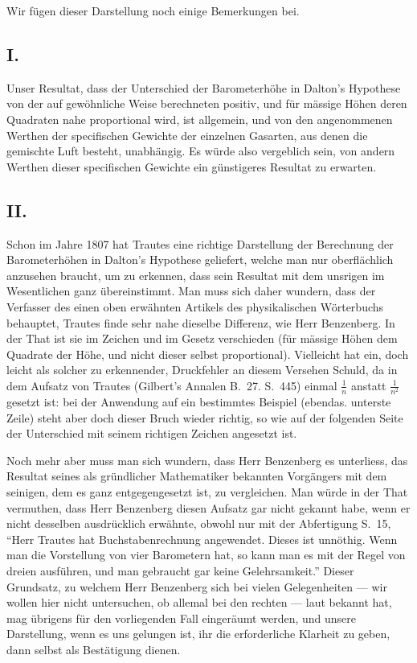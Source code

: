 \documentclass[fontsize=10pt,paper=a5,pagesize=auto]{scrbook}
\newcommand{\origpage}[1]{\marginpar{\footnotesize\textit{S. #1}}}
\begin{document}
Wir fügen dieser Darstellung noch einige Bemerkungen bei.

\subsection*{I.}
Unser Resultat, dass der Unterschied der Barometerhöhe in Dalton's Hypothese von der auf gewöhnliche Weise berechneten positiv, und für mässige Höhen deren Quadraten nahe proportional wird, ist allgemein, und von den angenommenen Werthen der specifischen Gewichte der einzelnen Gasarten, aus denen die gemischte Luft besteht, unabhängig. Es würde also vergeblich sein, von andern Werthen dieser specifischen Gewichte ein günstigeres Resultat zu erwarten.

\subsection*{II.}
\origpage{590}
Schon im Jahre 1807 hat Trautes eine richtige Darstellung der Berechnung der Barometerhöhen in Dalton's Hypothese geliefert, welche man nur oberflächlich anzusehen braucht, um zu erkennen, dass sein Resultat mit dem unsrigen im Wesentlichen ganz übereinstimmt. Man muss sich daher wundern, dass der Verfasser des einen oben erwähnten Artikels des physikalischen Wörterbuchs behauptet, Trautes finde sehr nahe dieselbe Differenz, wie Herr Benzenberg. In der That ist sie im Zeichen und im Gesetz verschieden (für mässige Höhen dem Quadrate der Höhe, und nicht dieser selbst proportional). Vielleicht hat ein, doch leicht als solcher zu erkennender, Druckfehler an diesem Versehen Schuld, da in dem Aufsatz von Trautes (Gilbert's Annalen B.~27. S.~445) einmal $\frac{1}{n}$ anstatt $\frac{1}{n^2}$ gesetzt ist: bei der Anwendung auf ein bestimmtes Beispiel (ebendas. unterste Zeile) steht aber doch dieser Bruch wieder richtig, so wie auf der folgenden Seite der Unterschied mit seinem richtigen Zeichen angesetzt ist.

Noch mehr aber muss man sich wundern, dass Herr Benzenberg es unterliess, das Resultat seines als gründlicher Mathematiker bekannten Vorgängers mit dem seinigen, dem es ganz entgegengesetzt ist, zu vergleichen. Man würde in der That vermuthen, dass Herr Benzenberg diesen Aufsatz gar nicht gekannt habe, wenn er nicht desselben ausdrücklich erwähnte, obwohl nur mit der Abfertigung S.~15, \enquote{Herr Trautes hat Buchstabenrechnung angewendet. Dieses ist unnöthig. Wenn man die Vorstellung von vier Barometern hat, so kann man es mit der Regel von dreien ausführen, und man gebraucht gar keine Gelehrsamkeit.} Dieser Grundsatz, zu welchem Herr Benzenberg sich bei vielen Gelegenheiten --- wir wollen hier nicht untersuchen, ob allemal bei den rechten --- laut bekannt hat, mag übrigens für den vorliegenden Fall eingeräumt werden, und unsere Darstellung, wenn es uns gelungen ist, ihr die erforderliche Klarheit zu geben, dann selbst als Bestätigung dienen.
\end{document}
